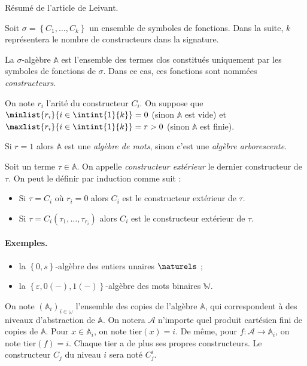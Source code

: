 \documentclass{report}
\newcommand{\bbA}{\mathbb{A}}
\begin{document}
		
		Résumé de l'article \cite{Leivant1995} de Leivant. 
		
		\begin{definition}
			\label{def:algebre}
			Soit $\sigma = \left\lbrace C_1, \dots, C_k \right\rbrace$ un ensemble de symboles de fonctions. Dans la suite, $k$ représentera le nombre de constructeurs dans la signature.
			
			La $\sigma$-algèbre $\bbA$ est l'ensemble des termes clos constitués uniquement par les symboles de fonctions de $\sigma$. Dans ce cas, ces fonctions sont nommées \emph{constructeurs}. 
			
			On note $r_i$ l'arité du constructeur $C_i$. On suppose que $\minlist{r_i}{i\in\intint{1}{k}} = 0$ (sinon $\bbA$ est vide) et $\maxlist{r_i}{i\in\intint{1}{k}} = r > 0$ (sinon $\bbA$ est finie).
			
			Si $r = 1$ alors $\mathbb{A}$ est une \emph{algèbre de mots}, sinon c'est une \emph{algèbre arborescente}.
			
			Soit un terme $\tau \in \bbA$. On appelle \emph{constructeur extérieur} le dernier constructeur de $\tau$. On peut le définir par induction comme suit :
			
			\begin{itemize}[itemsep=-1mm]
				\item 	Si $\tau = C_i$ où $r_i = 0$ alors $C_i$ est le constructeur extérieur de $\tau$.
				\item 	Si $\tau = C_i(\tau_1, \dots, \tau_{r_i})$ alors $C_{i}$ est le constructeur extérieur de $\tau$.
			\end{itemize}
		\end{definition}
		
		
		\paragraph{Exemples.}
		\begin{itemize}[itemsep=-1mm]
			\item 	la $\left\lbrace 0, s \right\rbrace$-algèbre des entiers unaires $\naturels$ ;
			\item 	la $\left\lbrace \varepsilon, 0(-), 1(-)\right\rbrace$-algèbre des mots binaires $\mathbb{W}$.
		\end{itemize}
		
		\espace
		
		
		On note $(\bbA_i)_{i\in \omega}$ l'ensemble des copies de l'algèbre $\bbA$, qui correspondent à des niveaux d'abstraction de $\bbA$. On notera $\mathcal{A}$ n'importe quel produit cartésien fini de copies de $\bbA$. Pour $x\in \bbA_i$, on note $\text{tier}(x) = i$. De même, pour $f : \mathcal{A} \to \bbA_i$, on note $\text{tier}(f) = i$. Chaque tier a de plus ses propres constructeurs. Le constructeur $C_j$ du niveau $i$ sera noté $C_j^i$. 
		
\end{document}
